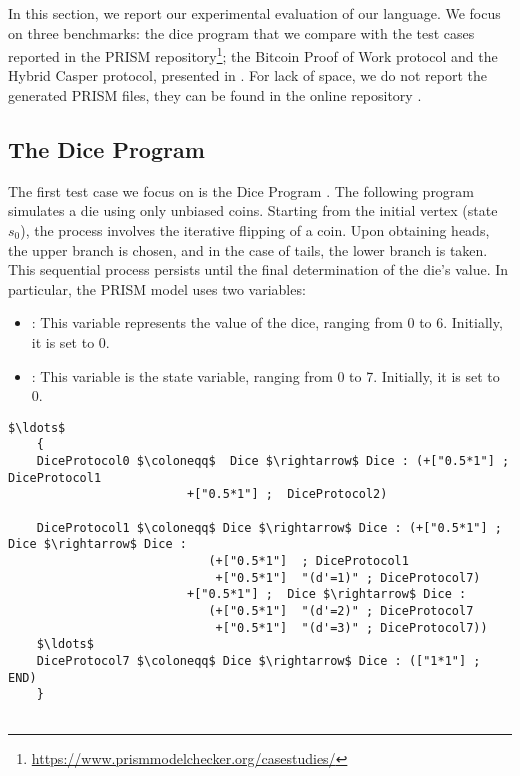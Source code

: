 In  this section, we report our experimental evaluation of our language. 
We focus on three benchmarks: the dice program that we compare with the  
test cases reported in the PRISM repository\footnote{\url{https://www.prismmodelchecker.org/casestudies/}}; 
the Bitcoin Proof of Work protocol and the Hybrid Casper protocol, 
presented in \cite{DBLP:journals/concurrency/BistarelliNGLMV23,DBLP:journals/distribledger/GallettaLMV23}.
For lack of space, we do not report the generated PRISM files, they can be found in the online repository \cite{repository}.

\subsection{The Dice Program}
 The first test case we focus on is the Dice Program \cite{KY76}.
 The following program simulates a die using only unbiased coins. Starting from the initial vertex (state $s_0$), the process involves the iterative flipping of a coin. Upon obtaining heads, the upper branch is chosen, and in the case of tails, the lower branch is taken. This sequential process persists until the final determination of the die's value.
 In particular, the PRISM model uses two variables: 
 \begin{itemize}
	\item {}: This variable represents the value of the dice, ranging from 0 to 6. Initially, it is set to 0.
	\item {}: This variable is the state variable, ranging from 0 to 7. Initially, it is set to 0.
 \end{itemize}
 
 \vspace{-0.25cm}
 \begin{lstlisting}[style=chor-color,caption={Choreographic language for the Dice Program},captionpos=b,label={ex1-code}]
	$\ldots$
	{
	DiceProtocol0 $\coloneqq$  Dice $\rightarrow$ Dice : (+["0.5*1"] ; DiceProtocol1
						 +["0.5*1"] ;  DiceProtocol2)
	
	DiceProtocol1 $\coloneqq$ Dice $\rightarrow$ Dice : (+["0.5*1"] ; Dice $\rightarrow$ Dice : 
							(+["0.5*1"]  ; DiceProtocol1
							 +["0.5*1"]  "(d'=1)" ; DiceProtocol7)
					     +["0.5*1"] ;  Dice $\rightarrow$ Dice : 
							(+["0.5*1"]  "(d'=2)" ; DiceProtocol7
							 +["0.5*1"]  "(d'=3)" ; DiceProtocol7))
	$\ldots$
	DiceProtocol7 $\coloneqq$ Dice $\rightarrow$ Dice : (["1*1"] ; END)
	}
		
	\end{lstlisting}

